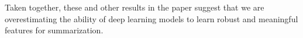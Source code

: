 %
%


Taken together, these and other results in the paper suggest that we are 
overestimating the ability of deep learning models to learn robust and 
meaningful features for summarization. 




